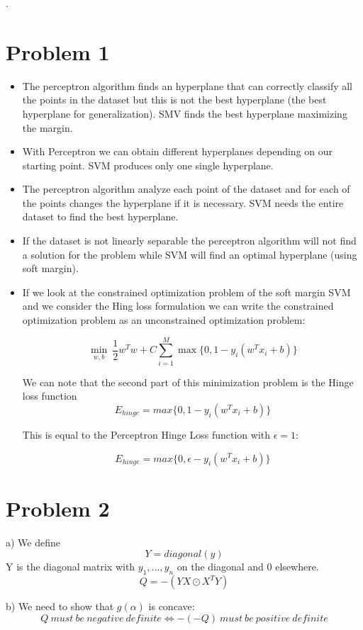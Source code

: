 \documentclass[12pt,letterpaper]{article}
\begin{document}
.

\section*{Problem 1}

\begin{itemize}
\item The perceptron algorithm finds an hyperplane that can correctly classify all the points in the dataset but this is not the best hyperplane (the best hyperplane for generalization).
SMV finds the best hyperplane maximizing the margin.
\item With Perceptron we can obtain different hyperplanes depending on our starting point. SVM produces only one single hyperplane.
\item The perceptron algorithm analyze each point of the dataset and for each of the points changes the hyperplane if it is necessary. SVM needs the entire dataset to find the best hyperplane.
\item If the dataset is not linearly separable the perceptron algorithm will not find a solution for the problem while SVM will find an optimal hyperplane (using soft margin).
\item If we look at the constrained optimization problem of the soft margin SVM and we consider the Hing loss formulation we can write the constrained optimization problem as an unconstrained optimization problem:

$$\min_{w,b} \ \frac{1}{2}w^Tw + C \sum_{i=1}^M\max\{0, 1-y_i(w^Tx_i+b)\}$$

We can note that the second part of this minimization problem is the Hinge loss function $$E_{hinge} = max\{0, 1-y_i(w^Tx_i+b)\}$$

This is equal to the Perceptron Hinge Loss function with $\epsilon = 1$:

$$E_{hinge} = max\{0, \epsilon-y_i(w^Tx_i+b)\}$$

\end{itemize}

\section*{Problem 2}

a) We define $$Y = diagonal(y)$$
Y is the diagonal matrix with $y_1,...,y_n$ on the diagonal and 0 elsewhere.
$$Q = - (Y  X \odot X^T  Y)$$

b) 
We need to show that $g(\alpha)$ is concave: $$Q\ must\ be\ negative\ definite \Leftrightarrow -(-Q) \ must \ be \ positive \ definite$$
\end{document}
